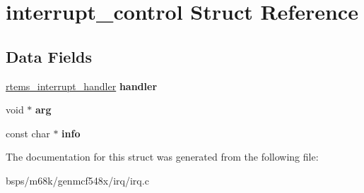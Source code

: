 \hypertarget{structinterrupt__control}{}\section{interrupt\+\_\+control Struct Reference}
\label{structinterrupt__control}
\subsection*{Data Fields}
\begin{DoxyCompactItemize}
\item 
\mbox{\label{structinterrupt__control_a8a08729853a77db2baa10f9fcc36e00b}} 
\mbox{\hyperlink{group__rtems__interrupt__extension_gab39bd096ab2c3b41d03dace0e9777b08}{rtems\+\_\+interrupt\+\_\+handler}} {\bfseries handler}
\item 
\mbox{\label{structinterrupt__control_a1cc613859726ee03c6d04059835b04d4}} 
void $\ast$ {\bfseries arg}
\item 
\mbox{\label{structinterrupt__control_a808030e78660e0fd3e3467862423b697}} 
const char $\ast$ {\bfseries info}
\end{DoxyCompactItemize}


The documentation for this struct was generated from the following file\+:\begin{DoxyCompactItemize}
\item 
bsps/m68k/genmcf548x/irq/irq.\+c\end{DoxyCompactItemize}
